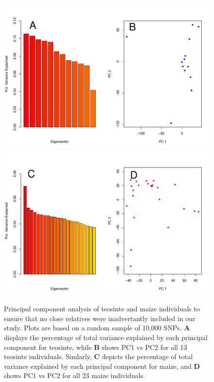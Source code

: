\documentclass[12pt,a4paper]{article}
\begin{document}
\begin{figure}
  \begin{center}
  \includegraphics[width=.75\textwidth]{FigsAndFiles/tilPCA_aug.pdf}\\
  \includegraphics[width=.75\textwidth]{FigsAndFiles/bknPCA_aug.pdf}\\
  \end{center}
  \caption{Principal component analysis of teosinte and maize individuals to ensure that no close relatives were inadvertantly included in our study. Plots are based on a random sample of 10,000 SNPs. {\bf A} displays the percentage of total variance explained by each principal component for teosinte, while {\bf B} shows PC1 vs PC2 for all 13 teosinte individuals. Simlarly, {\bf C} depicts the percentage of total variance explained by each principal component for maize, and {\bf D} shows PC1 vs PC2 for all 23 maize individuals. \label{sFig:PCA}}
\end{figure}
\clearpage
\end{document}
